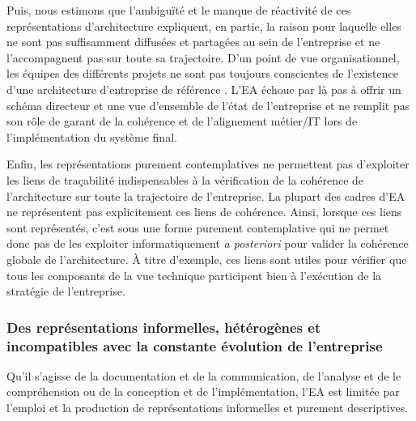 Puis, nous estimons que l'ambiguïté et le manque de réactivité de ces
représentations d'architecture expliquent, en partie, la raison pour laquelle
elles ne sont pas suffisamment diffusées et partagées au sein de l'entreprise
et ne l'accompagnent pas sur toute sa trajectoire. D'un point de vue
organisationnel, les équipes des différents projets ne sont pas toujours
conscientes de l'existence d'une architecture d'entreprise de référence
\cite{shah2007frameworks}. L'EA échoue par là pas à offrir un schéma directeur
et une vue d'ensemble de l'état de l'entreprise et ne remplit pas son rôle de
garant de la cohérence et de l'alignement métier/IT lors de l'implémentation du
système final.

 Enfin, les représentations purement contemplatives ne permettent pas
d'exploiter les liens de traçabilité indispensables à la vérification de la
cohérence de l'architecture sur toute la trajectoire de l'entreprise. La
plupart des cadres d'EA ne représentent pas explicitement ces liens de
cohérence. Ainsi, lorsque ces liens sont représentés, c'est sous une forme
purement contemplative qui ne permet donc pas de les exploiter informatiquement
\textit{a posteriori} pour valider la cohérence globale de l'architecture. À
titre d'exemple, ces liens sont utiles pour vérifier que tous les composants de
la vue technique participent bien à l'exécution de la stratégie de
l'entreprise.

        \subsubsection{Des représentations informelles, hétérogènes et incompatibles avec
la constante évolution de l'entreprise}
Qu'il s'agisse de la documentation et de la
communication, de l'analyse et de le compréhension ou de la conception
et de l'implémentation, l'EA est limitée par l'emploi et la production de
représentations informelles et purement descriptives.

